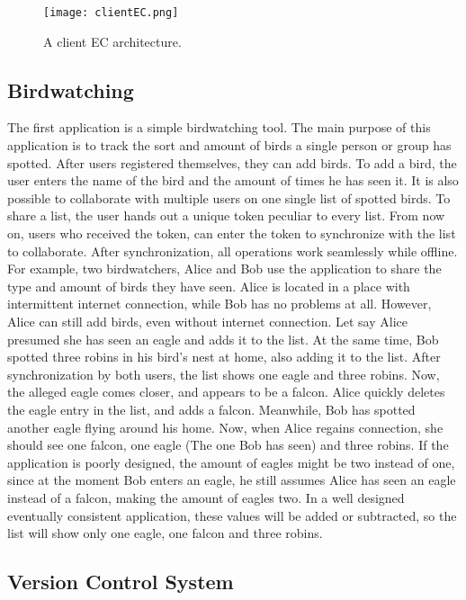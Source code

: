 \documentclass[a4paper,12pt]{report}
\begin{document}
\begin{figure}
    \small
    \centering
    \texttt{[image: clientEC.png]}
    \caption{A client EC architecture.}
    \label{fig:clientEC}
\end{figure}

\subsection{Birdwatching}\label{subsec:Birdwatching}

The first application is a simple birdwatching tool. The main purpose of this application is to track the sort and amount of birds a single person or group has spotted. After users registered themselves, they can add birds. To add a bird, the user enters the name of the bird and the amount of times he has seen it. It is also possible to collaborate with multiple users on one single list of spotted birds. To share a list, the user hands out a unique token peculiar to every list. From now on, users who received the token, can enter the token to synchronize with the list to collaborate. After synchronization, all operations work seamlessly while offline. For example, two birdwatchers, Alice and Bob use the application to share the type and amount of birds they have seen. Alice is located in a place with intermittent internet connection, while Bob has no problems at all. However, Alice can still add birds, even without internet connection. Let say Alice presumed she has seen an eagle and adds it to the list. At the same time, Bob spotted three robins in his bird's nest at home, also adding it to the list. After synchronization by both users, the list shows one eagle and three robins. Now, the alleged eagle comes closer, and appears to be a falcon. Alice quickly deletes the eagle entry in the list, and adds a falcon. Meanwhile, Bob has spotted another eagle flying around his home. Now, when Alice regains connection, she should see one falcon, one eagle (The one Bob has seen) and three robins. If the application is poorly designed, the amount of eagles might be two instead of one, since at the moment Bob enters an eagle, he still assumes Alice has seen an eagle instead of a falcon, making the amount of eagles two. In a well designed eventually consistent application, these values will be added or subtracted, so the list will show only one eagle, one falcon and three robins.

\subsection{Version Control System}\label{subsec:VCS}
\end{document}

